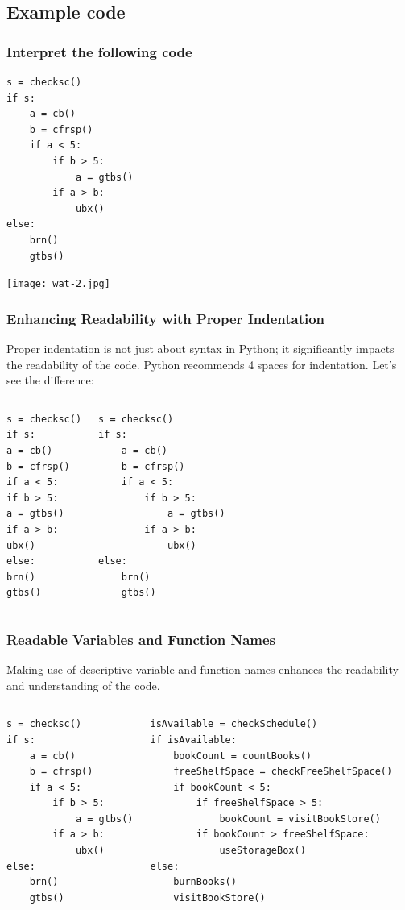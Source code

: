\subsection*{Example code}
\begin{frame}[fragile]
 \frametitle{Interpret the following code}
 \begin{lstlisting}
s = checksc()
if s:
    a = cb()
    b = cfrsp()
    if a < 5:
        if b > 5:
            a = gtbs()
        if a > b:
            ubx()
else:
    brn()
    gtbs()
 \end{lstlisting}
\end{frame}

\begin{frame}[plain]
\texttt{[image: wat-2.jpg]}
\end{frame}

\begin{frame}[fragile]
 \frametitle{Enhancing Readability with Proper Indentation}
 Proper indentation is not just about syntax in Python; it significantly impacts the readability of the code. Python recommends 4 spaces for indentation. Let's see the difference:
 \pause
 \begin{columns}[T]
     \begin{lstlisting}
s = checksc()
if s:
a = cb()
b = cfrsp()
if a < 5:
if b > 5:
a = gtbs()
if a > b:
ubx()
else:
brn()
gtbs()
 \end{lstlisting}
     \begin{lstlisting}
s = checksc()
if s:
    a = cb()
    b = cfrsp()
    if a < 5:
        if b > 5:
            a = gtbs()
        if a > b:
            ubx()
else:
    brn()
    gtbs()
 \end{lstlisting}
 \end{columns}
\end{frame}

\begin{frame}[fragile]
 \frametitle{Readable Variables and Function Names}
 Making use of descriptive variable and function names enhances the readability and understanding of the code. 
 \begin{columns}[T]
\begin{lstlisting}
s = checksc()
if s:
    a = cb()
    b = cfrsp()
    if a < 5:
        if b > 5:
            a = gtbs()
        if a > b:
            ubx()
else:
    brn()
    gtbs()
 \end{lstlisting}
     \begin{lstlisting}
isAvailable = checkSchedule()
if isAvailable:
    bookCount = countBooks()
    freeShelfSpace = checkFreeShelfSpace()
    if bookCount < 5:
        if freeShelfSpace > 5:
            bookCount = visitBookStore()
        if bookCount > freeShelfSpace:
            useStorageBox()
else:
    burnBooks()
    visitBookStore()
 \end{lstlisting}
 \end{columns}
\end{frame}

